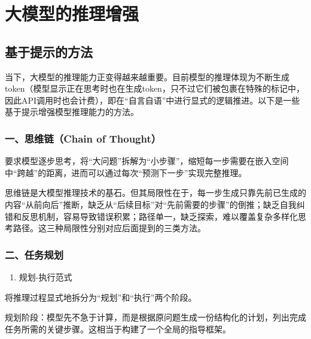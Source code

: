 \hypertarget{ux5927ux6a21ux578bux7684ux63a8ux7406ux589eux5f3a}{%
\chapter{大模型的推理增强}\label{ux5927ux6a21ux578bux7684ux63a8ux7406ux589eux5f3a}}

\hypertarget{ux57faux4e8eux63d0ux793aux7684ux65b9ux6cd5}{%
\section{基于提示的方法}\label{ux57faux4e8eux63d0ux793aux7684ux65b9ux6cd5}}

当下，大模型的推理能力正变得越来越重要。目前模型的推理体现为不断生成token（模型显示正在思考时也在生成token，只不过它们被包裹在特殊的标记中，因此API调用时也会计费），即在``自言自语''中进行显式的逻辑推进。以下是一些基于提示增强模型推理能力的方法。

\hypertarget{ux4e00ux601dux7ef4ux94fechain-of-thought}{%
\subsection{一、思维链（Chain of Thought）}\label{ux4e00ux601dux7ef4ux94fechain-of-thought}}

要求模型逐步思考，将``大问题''拆解为``小步骤''，缩短每一步需要在嵌入空间中``跨越''的距离，进而可以通过每次``预测下一步''实现完整推理。

思维链是大模型推理技术的基石。但其局限性在于，每一步生成只靠先前已生成的内容``从前向后''推断，缺乏从``后续目标''对``先前需要的步骤''的倒推；缺乏自我纠错和反思机制，容易导致错误积累；路径单一，缺乏探索，难以覆盖复杂多样化思考路径。这三种局限性分别对应后面提到的三类方法。

\hypertarget{ux4e8cux4efbux52a1ux89c4ux5212}{%
\subsection{二、任务规划}\label{ux4e8cux4efbux52a1ux89c4ux5212}}

\begin{enumerate}
\def\labelenumi{\arabic{enumi}.}
\tightlist
\item
  规划-执行范式
\end{enumerate}

将推理过程显式地拆分为``规划''和``执行''两个阶段。

规划阶段：模型先不急于计算，而是根据原问题生成一份结构化的计划，列出完成任务所需的关键步骤。这相当于构建了一个全局的指导框架。

